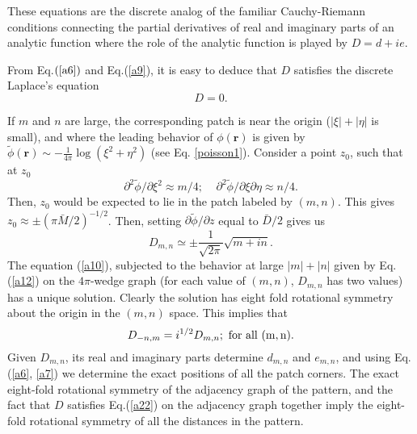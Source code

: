 \documentclass[11pt,a4paper]{book}
\begin{document}
These equations are the discrete analog of the familiar Cauchy-Riemann
conditions connecting the partial derivatives of real and imaginary 
parts of an analytic function where the role of the analytic function is 
played by   $ D = d + i e$.   

From Eq.$(\ref{a6})$ and Eq.(\ref{a9}), it is easy to deduce that $D$   
satisfies  the  discrete Laplace's equation
\begin{equation}
[\Delta_{\alpha} \Delta_{-\alpha} +\Delta_{\beta} \Delta_{-\beta}] D =0.
\label{a10}
\end{equation}

If $m$ and $n$ are large, the corresponding patch is near the origin
($|\xi|+|\eta|$ is small), and where the leading behavior of 
$\phi(\mathbf{r})$ is given by 
$\tilde{\phi}(\mathbf{r}) \sim -\frac{1}{4\pi}\log(\xi^2+\eta^2)$
(see Eq. \ref{poisson1}).
Consider a point $z_0$, such that at $z_0$
\begin{equation}
\partial^2 \tilde{\phi}/\partial \xi^2 \approx m/4;~~~~~
\partial^2 \tilde{\phi}/\partial \xi \partial \eta \approx n/4.
\end{equation}
Then, $z_0$ would be expected to lie in the patch labeled by $(m,n)$.
This gives $z_0 \approx \pm ( \pi \bar{M}/2)^{-1/2}$. Then, setting
$\partial \tilde{\phi}/\partial z$ equal to $\bar{D}/2$ gives us
\begin{equation}
D_{m,n} \simeq \pm \frac{1}{\sqrt{2\pi}} \sqrt{m + i n}.
\label{a12}
\end{equation}
The equation (\ref{a10}), subjected to the behavior at large
$|m|+|n|$ given by Eq.(\ref{a12}) on the $4 \pi$-wedge graph 
(for each value of $(m,n)$, $D_{m,n}$ has two values) has a unique
solution. Clearly the solution has eight fold rotational symmetry
about the origin in the $(m, n)$ space. This implies that 
\begin{equation}
D_{-n,m}=i^{1/2} D_{m,n}; \rm{~for~all~} (m,n).
\label{a22} 
\end{equation}
Given $D_{m,n}$, its real and imaginary parts determine $d_{m,n}$ and
$e_{m,n}$, and using Eq.(\ref{a6}, \ref{a7}) we determine the exact
positions of all the patch corners. 
The exact eight-fold rotational symmetry of the adjacency graph of the 
pattern, and the fact that $D$ satisfies Eq.(\ref{a22}) on the adjacency graph 
together imply the eight-fold rotational symmetry of all the distances 
in the pattern. 
\end{document}
